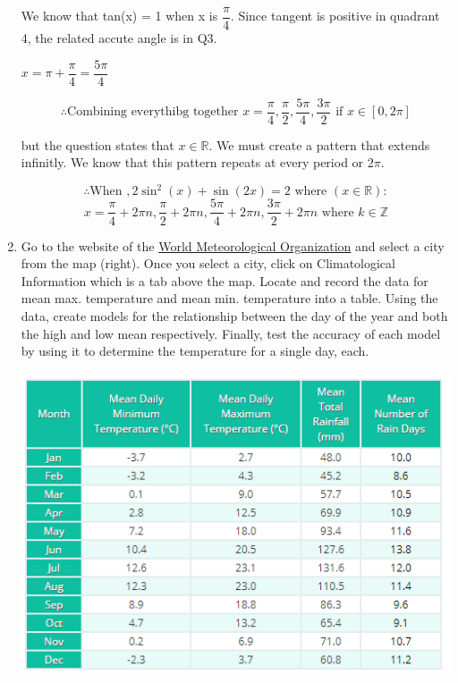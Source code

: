 \documentclass[12pt]{book}
\begin{document}
\begin{enumerate}
We know that tan(x) = 1 when x is $\boxed{\dfrac{\pi}{4}}$. Since tangent is positive in 
quadrant 4, the related accute angle is in Q3. 

$x = \pi + \dfrac{\pi}{4} = \boxed{\dfrac{5\pi}{4}}$

\newpage

$$\therefore \text{Combining everythibg together }x = \dfrac{\pi}{4}, \dfrac{\pi}{2}, \dfrac{5\pi}{4} , \dfrac{3\pi}{2} \text{ if } x \in [0, 2\pi]$$

but the question states that $x \in \mathbb{R}$. We must create a pattern that extends 
infinitly. We know that this pattern repeats at every period or $2\pi$.

$$\therefore \text{When }, 2\sin^2(x) + \sin(2x) = 2 \text{ where }(x \in \mathbb{R}):$$
$$\boxed{x = \dfrac{\pi}{4} + 2\pi n, \dfrac{\pi}{2} + 2\pi n, \dfrac{5\pi}{4} + 2\pi n , \dfrac{3\pi}{2} + 2\pi n \text{ where } k \in \mathbb{Z}}$$

\vspace{0.1cm}

\newpage

\item Go to the website of the \href{http://worldweather.wmo.int/}{World Meteorological Organization} and select a city from the map (right).
Once you select a city, click on Climatological Information which is a tab above the map. Locate and record the data for mean max. temperature and mean min. temperature into a table. Using the data, create models for the relationship between the day of the year and both the high and low mean respectively. Finally, test the accuracy of each model by using it to determine the temperature for a single day, each.

\begin{center}
    \includegraphics{mean minmax.PNG}
\end{center}


\end{enumerate}
\end{document}
